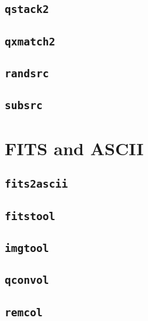\documentclass[12pt]{report}
\begin{document}
\subsection{\texttt{qstack2}} 
\subsection{\texttt{qxmatch2}} 
\subsection{\texttt{randsrc}} 
\subsection{\texttt{subsrc}} 

\section{FITS and ASCII \label{SEC:tool:fits}}
\subsection{\texttt{fits2ascii}} 
\subsection{\texttt{fitstool}} 
\subsection{\texttt{imgtool}} 
\subsection{\texttt{qconvol}} 
\subsection{\texttt{remcol}} 


\printindex
\end{document}
